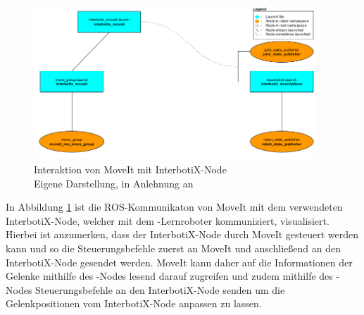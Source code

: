 \begin{figure}[htb]
	\centering
	\includegraphics[width=0.95\textwidth]{images/loesungsweg/moveit_flowchart}
	\caption[Interaktion von MoveIt mit InterbotiX-Node]{Interaktion von MoveIt mit InterbotiX-Node\\Eigene Darstellung, in Anlehnung an \cite{interbotixinterbotix_ros_arms_github_image_nodate}}
	\label{fig:interbotixinterbotix_ros_arms_github_image_nodate}
\end{figure}
\FloatBarrier

In Abbildung \ref{fig:interbotixinterbotix_ros_arms_github_image_nodate} ist die ROS-Kommunikaton von MoveIt mit dem verwendeten InterbotiX-Node, welcher mit dem -Lernroboter kommuniziert, visualisiert. Hierbei ist anzumerken, dass der InterbotiX-Node durch MoveIt gesteuert werden kann und so die Steuerungsbefehle zuerst an MoveIt und anschließend an den InterbotiX-Node gesendet werden. MoveIt kann daher auf die Informationen der Gelenke mithilfe des -Nodes lesend darauf zugreifen und zudem mithilfe des -Nodes Steuerungsbefehle an den InterbotiX-Node senden um die Gelenkpositionen vom InterbotiX-Node anpassen zu lassen.

